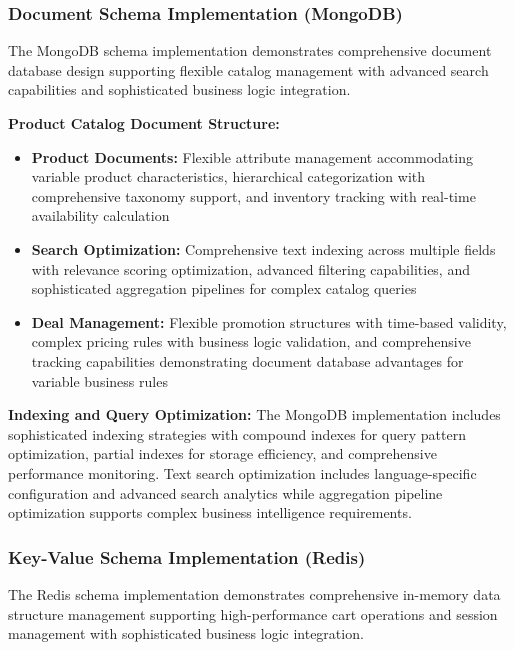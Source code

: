 \subsubsection{Document Schema Implementation (MongoDB)}

The MongoDB schema implementation demonstrates comprehensive document database design supporting flexible catalog management with advanced search capabilities and sophisticated business logic integration.

\textbf{Product Catalog Document Structure:}
\begin{itemize}
\item \textbf{Product Documents:} Flexible attribute management accommodating variable product characteristics, hierarchical categorization with comprehensive taxonomy support, and inventory tracking with real-time availability calculation
\item \textbf{Search Optimization:} Comprehensive text indexing across multiple fields with relevance scoring optimization, advanced filtering capabilities, and sophisticated aggregation pipelines for complex catalog queries
\item \textbf{Deal Management:} Flexible promotion structures with time-based validity, complex pricing rules with business logic validation, and comprehensive tracking capabilities demonstrating document database advantages for variable business rules
\end{itemize}

\textbf{Indexing and Query Optimization:}
The MongoDB implementation includes sophisticated indexing strategies with compound indexes for query pattern optimization, partial indexes for storage efficiency, and comprehensive performance monitoring. Text search optimization includes language-specific configuration and advanced search analytics while aggregation pipeline optimization supports complex business intelligence requirements.

\subsubsection{Key-Value Schema Implementation (Redis)}

The Redis schema implementation demonstrates comprehensive in-memory data structure management supporting high-performance cart operations and session management with sophisticated business logic integration.


